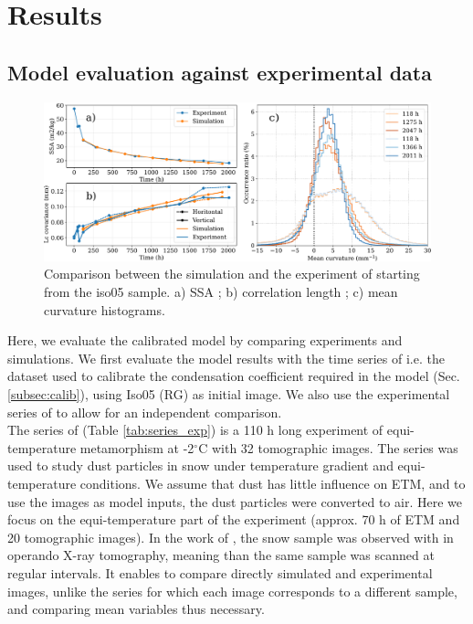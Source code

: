 \documentclass[draft,ms]{agujournal2019}
\begin{document}
\section{Results}

\subsection{Model evaluation against experimental data}
\label{Section:Calibration}

\begin{figure}
    \centering
    \includegraphics[width=\linewidth]{Figures/flin_evaluation_courbes_lc_ssa_histo.pdf}
    \caption{Comparison between the simulation and the experiment of \protect{} starting from the iso05 sample. a) SSA ; b) correlation length ; c) mean curvature histograms.}
    \label{fig:flin_evaluation}
\end{figure}

Here, we evaluate the calibrated model by comparing experiments and simulations. We first evaluate the model results with the time series of  i.e. the dataset used to calibrate the condensation coefficient required in the model (Sec. \ref{subsec:calib}), using  Iso05 (RG) as initial image. We also use the experimental series of  to allow for an independent comparison.\\

The series of  (Table \ref{tab:series_exp}) is a 110 h long experiment of equi-temperature metamorphism at -2$^\circ$C with 32 tomographic images. The series was used to study dust particles in snow under temperature gradient and equi-temperature conditions. We assume that dust has little influence on ETM, and to use the images as model inputs, the dust particles were converted to air. Here we focus on the equi-temperature part of the experiment (approx. 70 h of ETM and 20 tomographic images). In the work of , the snow sample was observed with in operando X-ray tomography, meaning than the same sample was scanned at regular intervals. It enables to compare directly simulated and experimental images, unlike the  series for which each image corresponds to a different sample, and comparing mean variables thus necessary.\\
\end{document}
